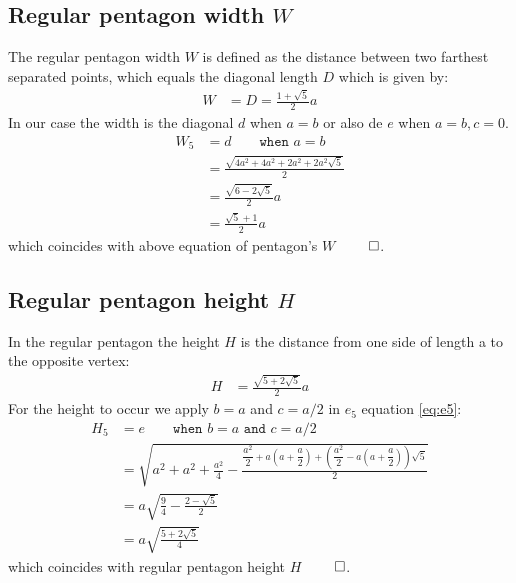 \documentclass[11pt]{article}
\begin{document}
\subsection{Regular pentagon width $W$}

The regular pentagon width $W$ is defined as the 
distance between two farthest separated points, which equals the diagonal length $D$
which is given by:
\begin{align}
W &= D = \frac{1+\sqrt5}{2}a
\end{align}
In our case the width is the diagonal $d$ when $a=b$ or also de $e$ when $a=b,c=0$.
\begin{align}
W_5 &= d \qquad \texttt{when } a=b\nonumber\\
 &= \frac{\sqrt{4a^2 + 4a^2 + 2a^2 + 2a^2\sqrt5}}2\nonumber\\
 &= \frac{\sqrt{6-2\sqrt5}}{2}a\nonumber\\
 &= \frac{\sqrt5+1}{2}a
\end{align}
which coincides with above equation of pentagon's $W$ $\qed$.

\subsection{Regular pentagon height $H$}

In the regular pentagon the height $H$ is the distance from one side of length a to the opposite vertex:
\begin{align}
H &= \frac{\sqrt{5+2\sqrt{5}}}{2}a
\end{align}
For the height to occur we apply $b = a$ and $c = a/2$ in $e_5$ equation \ref{eq:e5}:
\begin{align}
H_5 &= e \qquad \texttt{when } b=a \texttt{ and } c=a/2 \nonumber\\
 &= \sqrt{a^2 + a^2 + \frac{a^2}4
 - \frac{\dfrac{a^2}2 + a\left(a+\dfrac{a}2\right) 
 + \left(\dfrac{a^2}2 - a\left(a+\dfrac{a}2\right)\right)\sqrt5}2} \nonumber\\
 &= a\sqrt{\frac{9}4 - \frac{2 - \sqrt5}{2}} \nonumber\\
 &= a\sqrt{\frac{5+2\sqrt5}{4}}
\end{align}
which coincides with regular pentagon height $H$ $\qed$.
\end{document}
